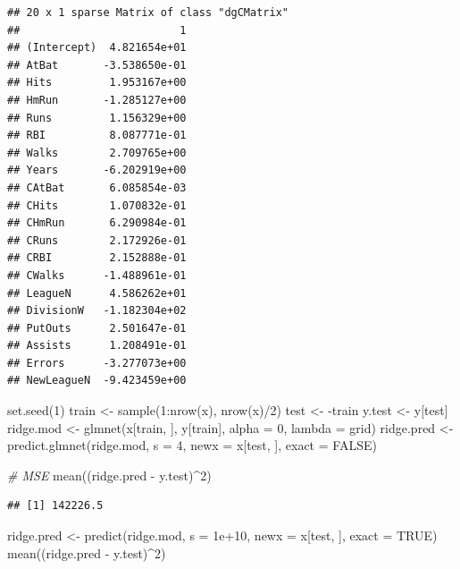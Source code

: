\documentclass[
  12pt,
]{book}
\newenvironment{Shaded}{\begin{snugshade}}{\end{snugshade}}
\newcommand{\AttributeTok}[1]{\textcolor[rgb]{0.77,0.63,0.00}{#1}}
\newcommand{\CommentTok}[1]{\textcolor[rgb]{0.56,0.35,0.01}{\textit{#1}}}
\newcommand{\ConstantTok}[1]{\textcolor[rgb]{0.00,0.00,0.00}{#1}}
\newcommand{\DecValTok}[1]{\textcolor[rgb]{0.00,0.00,0.81}{#1}}
\newcommand{\FloatTok}[1]{\textcolor[rgb]{0.00,0.00,0.81}{#1}}
\newcommand{\FunctionTok}[1]{\textcolor[rgb]{0.00,0.00,0.00}{#1}}
\newcommand{\NormalTok}[1]{#1}
\newcommand{\OtherTok}[1]{\textcolor[rgb]{0.56,0.35,0.01}{#1}}
\newcommand{\SpecialCharTok}[1]{\textcolor[rgb]{0.00,0.00,0.00}{#1}}
\theoremstyle{definition}
\theoremstyle{definition}
\theoremstyle{definition}
\theoremstyle{remark}
\begin{document}
\begin{verbatim}
## 20 x 1 sparse Matrix of class "dgCMatrix"
##                         1
## (Intercept)  4.821654e+01
## AtBat       -3.538650e-01
## Hits         1.953167e+00
## HmRun       -1.285127e+00
## Runs         1.156329e+00
## RBI          8.087771e-01
## Walks        2.709765e+00
## Years       -6.202919e+00
## CAtBat       6.085854e-03
## CHits        1.070832e-01
## CHmRun       6.290984e-01
## CRuns        2.172926e-01
## CRBI         2.152888e-01
## CWalks      -1.488961e-01
## LeagueN      4.586262e+01
## DivisionW   -1.182304e+02
## PutOuts      2.501647e-01
## Assists      1.208491e-01
## Errors      -3.277073e+00
## NewLeagueN  -9.423459e+00
\end{verbatim}

\begin{Shaded}
\begin{Highlighting}[]
\FunctionTok{set.seed}\NormalTok{(}\DecValTok{1}\NormalTok{)}
\NormalTok{train }\OtherTok{\textless{}{-}} \FunctionTok{sample}\NormalTok{(}\DecValTok{1}\SpecialCharTok{:}\FunctionTok{nrow}\NormalTok{(x), }\FunctionTok{nrow}\NormalTok{(x)}\SpecialCharTok{/}\DecValTok{2}\NormalTok{)}
\NormalTok{test }\OtherTok{\textless{}{-}} \SpecialCharTok{{-}}\NormalTok{train}
\NormalTok{y.test }\OtherTok{\textless{}{-}}\NormalTok{ y[test]}
\NormalTok{ridge.mod }\OtherTok{\textless{}{-}} \FunctionTok{glmnet}\NormalTok{(x[train, ], y[train], }\AttributeTok{alpha =} \DecValTok{0}\NormalTok{, }
    \AttributeTok{lambda =}\NormalTok{ grid)}
\NormalTok{ridge.pred }\OtherTok{\textless{}{-}} \FunctionTok{predict.glmnet}\NormalTok{(ridge.mod, }\AttributeTok{s =} \DecValTok{4}\NormalTok{, }\AttributeTok{newx =}\NormalTok{ x[test, }
\NormalTok{    ], }\AttributeTok{exact =} \ConstantTok{FALSE}\NormalTok{)}
\end{Highlighting}
\end{Shaded}

\begin{Shaded}
\begin{Highlighting}[]
\CommentTok{\# MSE}
\FunctionTok{mean}\NormalTok{((ridge.pred }\SpecialCharTok{{-}}\NormalTok{ y.test)}\SpecialCharTok{\^{}}\DecValTok{2}\NormalTok{)}
\end{Highlighting}
\end{Shaded}

\begin{verbatim}
## [1] 142226.5
\end{verbatim}

\begin{Shaded}
\begin{Highlighting}[]
\NormalTok{ridge.pred }\OtherTok{\textless{}{-}} \FunctionTok{predict}\NormalTok{(ridge.mod, }\AttributeTok{s =} \FloatTok{1e+10}\NormalTok{, }\AttributeTok{newx =}\NormalTok{ x[test, }
\NormalTok{    ], }\AttributeTok{exact =} \ConstantTok{TRUE}\NormalTok{)}
\FunctionTok{mean}\NormalTok{((ridge.pred }\SpecialCharTok{{-}}\NormalTok{ y.test)}\SpecialCharTok{\^{}}\DecValTok{2}\NormalTok{)}
\end{Highlighting}
\end{Shaded}
\end{document}
